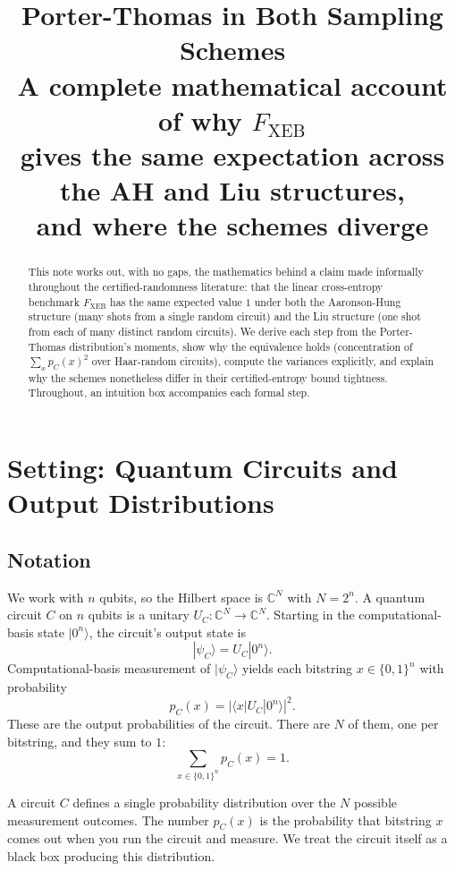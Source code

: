 \documentclass[11pt]{article}
\title{\textbf{Porter-Thomas in Both Sampling Schemes} \\
       \large A complete mathematical account of why $F_{\text{XEB}}$ \\
       gives the same expectation across the AH and Liu structures, \\
       and where the schemes diverge}
\author{}
\date{}
\theoremstyle{plain}
\theoremstyle{definition}
\newcommand{\Fxeb}{F_{\text{XEB}}}
\newcommand{\ket}[1]{|#1\rangle}
\newcommand{\bra}[1]{\langle #1|}
\begin{document}
\maketitle

\begin{abstract}
\noindent This note works out, with no gaps, the mathematics behind a claim made informally throughout the certified-randomness literature: that the linear cross-entropy benchmark $\Fxeb$ has the same expected value $1$ under both the Aaronson-Hung structure (many shots from a single random circuit) and the Liu structure (one shot from each of many distinct random circuits). We derive each step from the Porter-Thomas distribution's moments, show why the equivalence holds (concentration of $\sum_x p_C(x)^2$ over Haar-random circuits), compute the variances explicitly, and explain why the schemes nonetheless differ in their certified-entropy bound tightness. Throughout, an intuition box accompanies each formal step.
\end{abstract}

\tableofcontents

\section{Setting: Quantum Circuits and Output Distributions}

\subsection{Notation}

We work with $n$ qubits, so the Hilbert space is $\mathbb{C}^N$ with $N = 2^n$. A quantum circuit $C$ on $n$ qubits is a unitary $U_C : \mathbb{C}^N \to \mathbb{C}^N$. Starting in the computational-basis state $\ket{0^n}$, the circuit's output state is
\[
\ket{\psi_C} = U_C \ket{0^n}.
\]
Computational-basis measurement of $\ket{\psi_C}$ yields each bitstring $x \in \{0, 1\}^n$ with probability
\begin{equation}
p_C(x) = |\bra{x} U_C \ket{0^n}|^2.
\label{eq:prob}
\end{equation}
These are the output probabilities of the circuit. There are $N$ of them, one per bitstring, and they sum to $1$:
\begin{equation}
\sum_{x \in \{0,1\}^n} p_C(x) = 1.
\label{eq:normalization}
\end{equation}

\begin{intuition}
A circuit $C$ defines a single probability distribution over the $N$ possible measurement outcomes. The number $p_C(x)$ is the probability that bitstring $x$ comes out when you run the circuit and measure. We treat the circuit itself as a black box producing this distribution.
\end{intuition}
\end{document}
